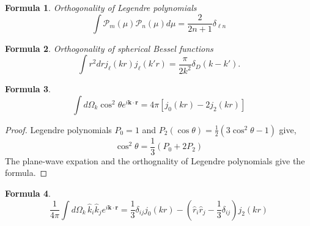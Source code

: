 \documentclass[a4paper,11pt]{article}
\newtheorem{formula}{Formula}[section]
\begin{document}
\begin{formula}
  Orthogonality of Legendre polynomials
  \begin{equation}
    \int \mathcal{P}_m(\mu) \mathcal{P}_n(\mu) d\mu =
    \frac{2}{2 n + 1} \delta_{\ell n}
  \end{equation}
\end{formula}

\begin{formula}
  Orthogonality of spherical Bessel functions
  \begin{equation}
    \int \! r^2 dr j_\ell(kr) j_\ell(k'r)
    = \frac{\pi}{2k^2} \delta_D(k - k').
  \end{equation}
\end{formula}

\begin{formula}
  \label{formula:cos2}
  \begin{equation}
    \int d\Omega_k \cos^2 \theta e^{i\bm{k}\cdot\bm{r}}
    =  4\pi \left[ j_0(kr) - 2 j_2(kr) \right]
  \end{equation}
\end{formula}

\begin{proof}
  Legendre polynomials $P_0 = 1$ and $P_2(\cos\theta) = \frac{1}{2} (3 \cos^2\theta - 1)$ give,
  \begin{equation}
    \cos^2 \theta = \frac{1}{3}( P_0 + 2P_2 )
  \end{equation}
  The plane-wave expation and the orthognality of Legendre polynomials give the formula.
\end{proof}

%
%
\begin{formula}
  \label{formula-moment}
  \begin{equation}
    \frac{1}{4\pi}\int d\Omega_k \, \hat{k}_i \hat{k}_j e^{i\bm{k}\cdot\bm{r}}
    = \frac{1}{3} \delta_{ij} j_0(kr) - \left(\hat{r}_i \hat{r}_j - \frac{1}{3} \delta_{ij} \right) j_2(kr)
  \end{equation}
\end{formula}
\end{document}
